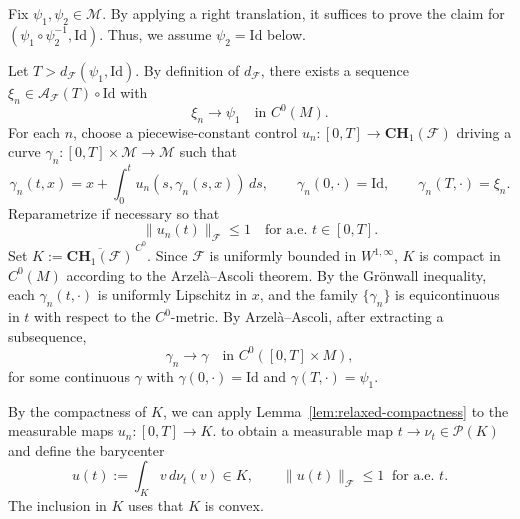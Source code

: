 \documentclass[12pt]{amsart}
\numberwithin{equation}{section}
\theoremstyle{remark}
\begin{document}
Fix $\psi_1,\psi_2\in\mathcal M$.
By applying a right translation,
it suffices to prove the claim for $(\psi_1\circ\psi_2^{-1},\mathrm{Id})$.
Thus, we assume $\psi_2=\mathrm{Id}$ below.

Let $T>d_{\mathcal F}(\psi_1,\mathrm{Id})$. By definition of $d_{\mathcal F}$,
there exists a sequence $\xi_n\in \mathcal A_{\mathcal F}(T)\circ \mathrm{Id}$ with
\begin{equation}
\label{eq:xi_n_to_psi1}
\xi_n\to \psi_1 \quad\text{in } C^0(M).
\end{equation}
For each $n$, choose a piecewise-constant control $u_n:[0,T]\to \mathbf{CH}_1(\mathcal F)$
driving a curve $\gamma_n:[0,T]\times \mathcal M\to \mathcal M$ such that
\begin{equation}
\label{eq:gamma_n_integral}
\gamma_n(t,x)=x+\int_0^t u_n(s,\gamma_n(s,x))\,ds,
\qquad \gamma_n(0,\cdot)=\mathrm{Id},\qquad \gamma_n(T,\cdot)=\xi_n.
\end{equation}
Reparametrize if necessary so that
\begin{equation}
\label{eq:unit-speed}
\|u_n(t)\|_{\mathcal F}\le 1 \quad\text{for a.e. }t\in[0,T].
\end{equation}
Set $K:=\overline{\mathbf{CH}_1(\mathcal F)}^{\,C^0}$.
Since $\mathcal F$ is uniformly bounded in $W^{1,\infty}$, $K$ is compact in $C^0(M)$ according to the Arzel\`a--Ascoli theorem.
By the Gr\"onwall inequality, each $\gamma_n(t,\cdot)$ is uniformly Lipschitz in $x$,
and the family $\{\gamma_n\}$ is equicontinuous in $t$ with respect to the $C^0$-metric.
By Arzel\`a--Ascoli, after extracting a subsequence,
\begin{equation}
\label{eq:gamma_n_to_gamma}
\gamma_n \to \gamma \quad\text{in } C^0([0,T]\times M),
\end{equation}
for some continuous $\gamma$ with $\gamma(0,\cdot)=\mathrm{Id}$ and
$\gamma(T,\cdot)=\psi_1$.

By the compactness of $K$, we can
apply Lemma~\ref{lem:relaxed-compactness} to the measurable maps $u_n:[0,T]\to K$.
to obtain a measurable map $t\to \nu_t\in\mathcal P(K)$ and define the barycenter
\begin{equation}
\label{eq:def_u}
u(t):=\int_K v\,d\nu_t(v)\in K,\qquad \|u(t)\|_{\mathcal F}\le 1\ \text{ for a.e. }t.
\end{equation}
The inclusion in $K$ uses that $K$ is convex.
\end{document}
